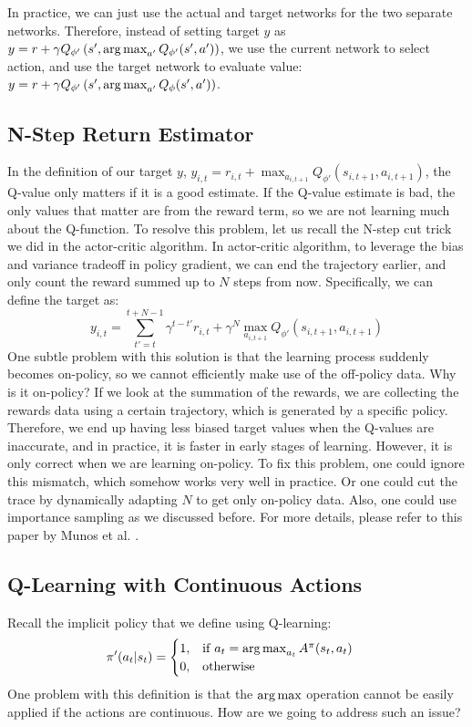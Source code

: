 In practice, we can just use the actual and target networks for the two separate networks. Therefore, instead of setting target $y$ as $y = r + \gamma Q_{\phi'}\left(s',\operatorname*{arg\,max}_{a'}Q_{\phi'}(s',a')\right)$, we use the current network to select action, and use the target network to evaluate value: $y = r + \gamma Q_{\phi'}\left(s',\operatorname*{arg\,max}_{a'}Q_{\phi}(s',a')\right)$.

\subsection{N-Step Return Estimator}
In the definition of our target $y$, $y_{i,t} = r_{i,t} + \max_{a_{i,t+1}}Q_{\phi'}(s_{i,t+1},a_{i,t+1})$, the Q-value only matters if it is a good estimate. If the Q-value estimate is bad, the only values that matter are from the reward term, so we are not learning much about the Q-function. To resolve this problem, let us recall the N-step cut trick we did in the actor-critic algorithm. In actor-critic algorithm, to leverage the bias and variance tradeoff in policy gradient, we can end the trajectory earlier, and only count the reward summed up to $N$ steps from now. Specifically, we can define the target as:
$$y_{i,t} = \sum_{t'=t}^{t+N-1}\gamma^{t-t'}r_{i,t} +\gamma^N \max_{a_{i,t+1}}Q_{\phi'}(s_{i,t+1},a_{i,t+1})$$
One subtle problem with this solution is that the learning process suddenly becomes on-policy, so we cannot efficiently make use of the off-policy data. Why is it on-policy? If we look at the summation of the rewards, we are collecting the rewards data using a certain trajectory, which is generated by a specific policy. Therefore, we end up having less biased target values when the Q-values are inaccurate, and in practice, it is faster in early stages of learning. However, it is only correct when we are learning on-policy. To fix this problem, one could ignore this mismatch, which somehow works very well in practice. Or one could cut the trace by dynamically adapting $N$ to get only on-policy data. Also, one could use importance sampling as we discussed before. For more details, please refer to this paper by Munos et al. \cite{munos2016safe}.
\subsection{Q-Learning with Continuous Actions}
Recall the implicit policy that we define using Q-learning:
\begin{align*}
\pi'(a_t|s_t) & = \begin{cases}
                1, & \mathrm{if } \;a_t = \operatorname*{arg\,max}_{a_t}A^\pi(s_t,a_t)\\
                 0, & \mathrm{otherwise}
                    \end{cases}
\end{align*}
One problem with this definition is that the $\operatorname*{arg\,max}$ operation cannot be easily applied if the actions are continuous. How are we going to address such an issue?

